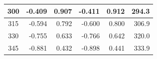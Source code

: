 \begin{table}[htbp]
\begin{center}
\begin{tabular}{|p{15 mm}|p{15 mm}|p{15 mm}|p{15 mm}|p{15 mm}|p{15 mm}|}
            \multicolumn{1}{|c|}{300}                  & \multicolumn{1}{|r|}{-0.409}                                  & \multicolumn{1}{|r|}{0.907}                                   & \multicolumn{1}{|r|}{-0.411}               & \multicolumn{1}{|r|}{0.912}                & \multicolumn{1}{|r|}{294.3}                    \\ \hline
            \multicolumn{1}{|c|}{315}                  & \multicolumn{1}{|r|}{-0.594}                                  & \multicolumn{1}{|r|}{0.792}                                   & \multicolumn{1}{|r|}{-0.600}               & \multicolumn{1}{|r|}{0.800}                & \multicolumn{1}{|r|}{306.9}                    \\ \hline
            \multicolumn{1}{|c|}{330}                  & \multicolumn{1}{|r|}{-0.755}                                  & \multicolumn{1}{|r|}{0.633}                                   & \multicolumn{1}{|r|}{-0.766}               & \multicolumn{1}{|r|}{0.642}                & \multicolumn{1}{|r|}{320.0}                    \\ \hline
            \multicolumn{1}{|c|}{345}                  & \multicolumn{1}{|r|}{-0.881}                                  & \multicolumn{1}{|r|}{0.432}                                   & \multicolumn{1}{|r|}{-0.898}               & \multicolumn{1}{|r|}{0.441}                & \multicolumn{1}{|r|}{333.9}                    \\ \hline
        \end{tabular}
    \end{center}
\end{table}

\newpage

